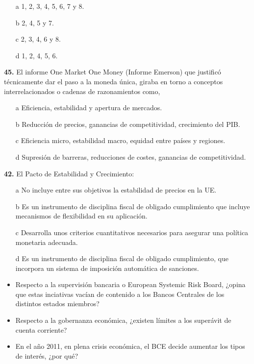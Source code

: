 \documentclass{nuevotema}
\begin{document}
\begin{enumerate}
	\item[a] 1, 2, 3, 4, 5, 6, 7 y 8.
	\item[b] 2, 4, 5 y 7.
	\item[c] 2, 3, 4, 6 y 8.
	\item[d] 1, 2, 4, 5, 6.
\end{enumerate}

\textbf{45.} El informe One Market One Money (Informe Emerson) que justificó técnicamente dar el paso a la moneda única, giraba en torno a conceptos interrelacionados o cadenas de razonamientos como,
\begin{enumerate}
	\item[a] Eficiencia, estabilidad y apertura de mercados.
	\item[b] Reducción de precios, ganancias de competitividad, crecimiento del PIB.
	\item[c] Eficiencia micro, estabilidad macro, equidad entre países y regiones.
	\item[d] Supresión de barreras, reducciones de costes, ganancias de competitividad.
\end{enumerate}




\textbf{42.} El Pacto de Estabilidad y Crecimiento:
\begin{enumerate}
	\item[a] No incluye entre sus objetivos la estabilidad de precios en la UE.
	\item[b] Es un instrumento de disciplina fiscal de obligado cumplimiento que incluye mecanismos de flexibilidad en su aplicación.
	\item[c] Desarrolla unos criterios cuantitativos necesarios para asegurar una política monetaria adecuada.
	\item[d] Es un instrumento de disciplina fiscal de obligado cumplimiento, que incorpora un sistema de imposición automática de sanciones.
\end{enumerate}

\begin{itemize}
	\item Respecto a la supervisión bancaria o European Systemic Risk Board, ¿opina que estas inciativas vacían de contenido a los Bancos Centrales de los distintos estados miembros?
	
	\item Respecto a la gobernanza económica, ¿existen límites a los superávit de cuenta corriente?
	
	\item En el año 2011, en plena crisis económica, el BCE decide aumentar los tipos de interés, ¿por qué?
\end{itemize}
\end{document}
